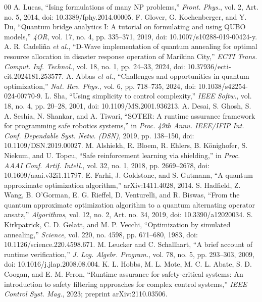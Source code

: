 \documentclass[conference]{IEEEtran}
\begin{document}
\balance
\begin{thebibliography}{00}
 A. Lucas, ``Ising formulations of many NP problems,'' \textit{Front. Phys.}, vol. 2, Art. no. 5, 2014, doi: 10.3389/fphy.2014.00005.
 F. Glover, G. Kochenberger, and Y. Du, ``Quantum bridge analytics I: A tutorial on formulating and using QUBO models,'' \textit{4OR}, vol. 17, no. 4, pp. 335--371, 2019, doi: 10.1007/s10288-019-00424-y.
 A. R. Cadeli\~{n}a \textit{et al.}, ``D-Wave implementation of quantum annealing for optimal resource allocation in disaster response operation of Marikina City,'' \textit{ECTI Trans. Comput. Inf. Technol.}, vol. 18, no. 1, pp. 24--33, 2024, doi: 10.37936/ecti-cit.2024181.253577.
 A. Abbas \textit{et al.}, ``Challenges and opportunities in quantum optimization,'' \textit{Nat. Rev. Phys.}, vol. 6, pp. 718--735, 2024, doi: 10.1038/s42254-024-00770-9.
 L. Sha, ``Using simplicity to control complexity,'' \textit{IEEE Softw.}, vol. 18, no. 4, pp. 20--28, 2001, doi: 10.1109/MS.2001.936213.
 A. Desai, S. Ghosh, S. A. Seshia, N. Shankar, and A. Tiwari, ``SOTER: A runtime assurance framework for programming safe robotics systems,'' in \textit{Proc. 49th Annu. IEEE/IFIP Int. Conf. Dependable Syst. Netw. (DSN)}, 2019, pp. 138--150, doi: 10.1109/DSN.2019.00027.
 M. Alshiekh, R. Bloem, R. Ehlers, B. K\"{o}nighofer, S. Niekum, and U. Topcu, ``Safe reinforcement learning via shielding,'' in \textit{Proc. AAAI Conf. Artif. Intell.}, vol. 32, no. 1, 2018, pp. 2669--2678, doi: 10.1609/aaai.v32i1.11797.
 E. Farhi, J. Goldstone, and S. Gutmann, ``A quantum approximate optimization algorithm,'' arXiv:1411.4028, 2014.
 S. Hadfield, Z. Wang, B. O'Gorman, E. G. Rieffel, D. Venturelli, and R. Biswas, ``From the quantum approximate optimization algorithm to a quantum alternating operator ansatz,'' \textit{Algorithms}, vol. 12, no. 2, Art. no. 34, 2019, doi: 10.3390/a12020034.
 S. Kirkpatrick, C. D. Gelatt, and M. P. Vecchi, ``Optimization by simulated annealing,'' \textit{Science}, vol. 220, no. 4598, pp. 671--680, 1983, doi: 10.1126/science.220.4598.671.
 M. Leucker and C. Schallhart, ``A brief account of runtime verification,'' \textit{J. Log. Algebr. Program.}, vol. 78, no. 5, pp. 293--303, 2009, doi: 10.1016/j.jlap.2008.08.004.
 K. L. Hobbs, M. L. Mote, M. C. L. Abate, S. D. Coogan, and E. M. Feron, ``Runtime assurance for safety-critical systems: An introduction to safety filtering approaches for complex control systems,'' \textit{IEEE Control Syst. Mag.}, 2023; preprint arXiv:2110.03506.

\end{thebibliography}
\end{document}
